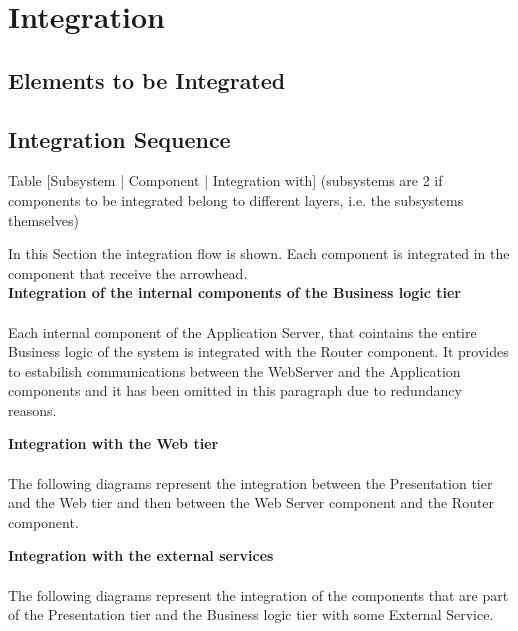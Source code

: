 \documentclass[../DD.tex]{subfiles}
\begin{document}
\section{Integration\label{5.3}}

\subsection{Elements to be Integrated\label{5.3.1}}



\subsection{Integration Sequence\label{5.3.2}}
Table [Subsystem | Component | Integration with]
(subsystems are 2 if components to be integrated belong to different layers, i.e. the subsystems themselves)

In this Section the integration flow is shown. Each component is integrated in the component that receive the arrowhead. \\

\textbf{Integration of the internal components of the Business logic tier} \\
\\ Each internal component of the Application Server, that cointains the entire Business logic of the system is integrated with the Router component. It provides to estabilish communications between the WebServer and the Application components and it has been omitted in this paragraph due to redundancy reasons.  \\


\textbf{Integration with the Web tier} \\
\\ The following diagrams represent the integration between the Presentation tier and the Web tier and then between the Web Server component and the Router component. \\


\textbf{Integration with the external services} \\
\\ The following diagrams represent the integration of the components that are part of the Presentation tier and the Business logic tier with some External Service. \\
\end{document}
